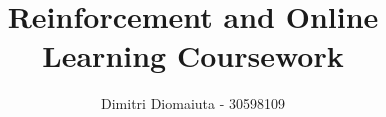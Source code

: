 \documentclass[runningheads]{llncs}
\begin{document}
%
\title{Reinforcement and Online Learning \; Coursework}
%
%
\author{Dimitri Diomaiuta - 30598109}
%
%
%
\maketitle              %
%
%
%
%
\end{document}
